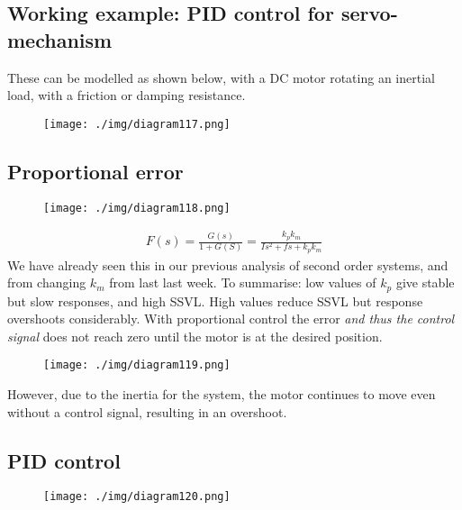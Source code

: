 \subsection{Working example: PID control for servo-mechanism}
These can be modelled as shown below, with a DC motor rotating an inertial load, with a friction or damping resistance.
\begin{figure}[H]
  \centerline{\texttt{[image: ./img/diagram117.png]}}
  \caption{}
\end{figure}
\subsection{Proportional error}
\begin{figure}[H]
  \centerline{\texttt{[image: ./img/diagram118.png]}}
  \caption{}
\end{figure}
\begin{gather}
  F(s) = \frac{G(s)}{1+ G(S)} = \frac{k_p k_m}{Is^2 + fs + k_p k_m}
\end{gather}
We have already seen this in our previous analysis of second order systems, and from changing $k_m$ from last last week. To summarise: low values of $k_p$ give stable but slow responses, and high SSVL. High values reduce SSVL but response overshoots considerably. With proportional control the error \textit{and thus the control signal} does not reach zero until the motor is at the desired position.
\begin{figure}[H]
  \centerline{\texttt{[image: ./img/diagram119.png]}}
  \caption{}
\end{figure}
However, due to the inertia for the system, the motor continues to move even without a control signal, resulting in an overshoot.
\subsection{PID control}
\begin{figure}[H]
  \centerline{\texttt{[image: ./img/diagram120.png]}}
  \caption{}
\end{figure}
